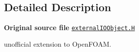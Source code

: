 \subsection{Detailed Description}
{\bfseries Original source file} \href{../../../home/carlo/data/GeN-Foam/GeN-Foam_ffn/GeN-Foam/GeN-Foam/FMU4FOAM/ECI4FOAM/src/externalComm/externalIO/externalIOObject.H}{\tt external\+I\+O\+Object.\+H}

\begin{DoxyVerb}unofficial extension to OpenFOAM.\end{DoxyVerb}
